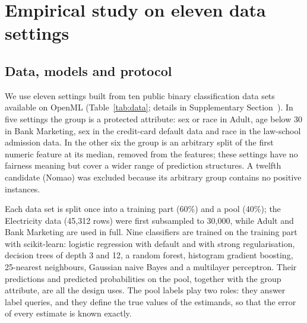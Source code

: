 \section{Empirical study on eleven data settings}\label{sec:empirical}

\subsection{Data, models and protocol}
We use eleven settings built from ten public binary classification data sets available on OpenML (Table~\ref{tab:data}; details in Supplementary Section~). In five settings the group is a protected attribute: sex or race in Adult, age below 30 in Bank Marketing, sex in the credit-card default data and race in the law-school admission data. In the other six the group is an arbitrary split of the first numeric feature at its median, removed from the features; these settings have no fairness meaning but cover a wider range of prediction structures. A twelfth candidate (Nomao) was excluded because its arbitrary group contains no positive instances.

Each data set is split once into a training part (60\%) and a pool (40\%); the Electricity data (45,312 rows) were first subsampled to 30,000, while Adult and Bank Marketing are used in full. Nine classifiers are trained on the training part with scikit-learn: logistic regression with default and with strong regularisation, decision trees of depth 3 and 12, a random forest, histogram gradient boosting, 25-nearest neighbours, Gaussian naive Bayes and a multilayer perceptron. Their predictions and predicted probabilities on the pool, together with the group attribute, are all the design uses. The pool labels play two roles: they answer label queries, and they define the true values of the estimands, so that the error of every estimate is known exactly.

